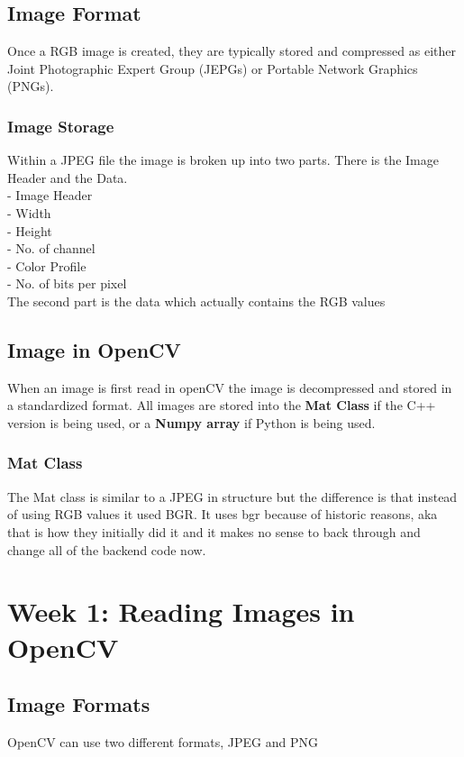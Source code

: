 \documentclass[fleqn]{article}
\begin{document}
    \subsection{Image Format}
    Once a RGB image is created, they are typically stored and compressed as either Joint Photographic Expert Group (JEPGs) or Portable Network Graphics (PNGs).

    \subsubsection{Image Storage}
    Within a JPEG file the image is broken up into two parts. There is the Image Header and the Data.\\
    \tab - Image Header\\
    \tab\tab - Width\\
    \tab\tab - Height\\
    \tab\tab - No. of channel\\
    \tab\tab - Color Profile\\
    \tab\tab - No. of bits per pixel\\
    The second part is the data which actually contains the RGB values

    \subsection{Image in OpenCV}
    When an image is first read in openCV the image is decompressed and stored in a standardized format. All images are stored into the \textbf{Mat Class} if the C++ version is being used, or a \textbf{Numpy array} if Python is being used.

    \subsubsection{Mat Class}
    The Mat class is similar to a JPEG in structure but the difference is that instead of using RGB values it used BGR. It uses bgr because of historic reasons, aka that is how they initially did it and it makes no sense to back through and change all of the backend code now.

    \newpage
    \clearpage
    \section{Week 1: Reading Images in OpenCV}
    \subsection{Image Formats}
    OpenCV can use two different formats, JPEG and PNG
\end{document}
